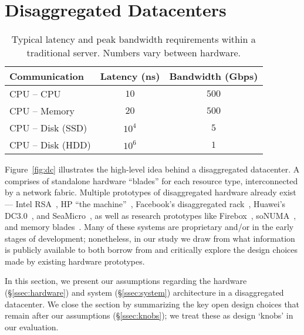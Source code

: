 \section{Disaggregated Datacenters}
\label{sec:summary}


\begin{table}
  \centering
  \small
  \begin{tabular}{l|c|c}
		\textbf{Communication} & \textbf{Latency (ns)} & \textbf{Bandwidth (Gbps)}\\\hline
	\hline
    CPU -- CPU & $10$ & $500$\\\hline
    CPU -- Memory & $20$ & $500$\\\hline
    CPU -- Disk (SSD) & $10^4$ & $5$\\\hline
    CPU -- Disk (HDD) & $10^6$ & $1$\\\hline
    \hline
  \end{tabular}
  \vspace{0.1in}
  \caption{\small{Typical latency and peak bandwidth requirements within a traditional server. Numbers vary between hardware.}}
  \label{tab:tech}
\end{table}

Figure~\ref{fig:dc} illustrates the high-level idea behind a disaggregated datacenter.
A \dis comprises of standalone hardware ``blades'' for each resource type,  interconnected by a network fabric.
Multiple prototypes of disaggregated hardware already exist --- Intel RSA~\cite{rsa}, HP ``the machine''~\cite{hptm}, Facebook's disaggregated rack~\cite{fdr}, Huawei's DC3.0~\cite{huawei}, and SeaMicro~\cite{seamicro}, as well as research prototypes like Firebox~\cite{firebox}, soNUMA~\cite{sonuma}, and memory blades~\cite{ddcHwDesign1}. 
Many of these systems are proprietary and/or in the early stages of development; nonetheless, in our study we draw from what information is publicly available to both borrow from and critically explore the design choices made by existing hardware prototypes.

In this section, we present our assumptions regarding the hardware (\S\ref{ssec:hardware}) and system (\S\ref{ssec:system}) architecture in a disaggregated datacenter.
We close the section by summarizing the key open design choices that remain after our assumptions (\S\ref{ssec:knobs}); we treat these as design `knobs' in our evaluation.

